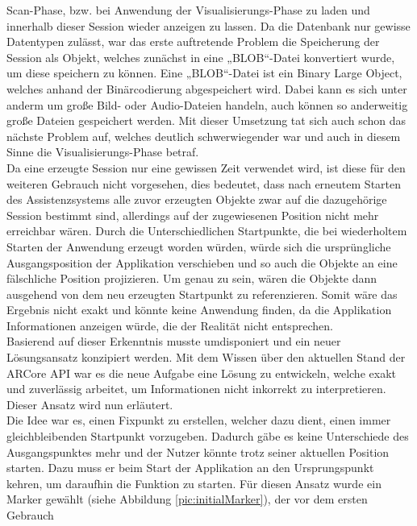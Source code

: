 Scan-Phase, bzw. bei Anwendung der Visualisierungs-Phase zu laden und innerhalb dieser Session wieder anzeigen zu lassen. Da die Datenbank nur gewisse Datentypen 
zulässt, war das erste auftretende Problem die Speicherung der Session als Objekt, welches zunächst in eine „BLOB“-Datei konvertiert wurde, um diese speichern 
zu können. Eine „BLOB“-Datei ist ein Binary Large Object, welches anhand der Binärcodierung abgespeichert wird. Dabei kann es sich unter anderm um große 
Bild- oder Audio-Dateien handeln, auch können so anderweitig große Dateien gespeichert werden. Mit dieser Umsetzung tat sich auch schon das nächste Problem auf, 
welches deutlich schwerwiegender war und auch in diesem Sinne die Visualisierungs-Phase betraf. 
\\ 
Da eine erzeugte Session nur eine gewissen Zeit verwendet wird, ist diese für den weiteren Gebrauch nicht vorgesehen, dies bedeutet, dass nach erneutem Starten 
des Assistenzsystems alle zuvor erzeugten Objekte zwar auf die dazugehörige Session bestimmt sind, allerdings auf der zugewiesenen Position 
nicht mehr erreichbar wären. Durch die Unterschiedlichen Startpunkte, die bei wiederholtem Starten der Anwendung erzeugt worden würden, 
würde sich die ursprüngliche Ausgangsposition der Applikation verschieben und so auch die Objekte an eine fälschliche Position projizieren. Um genau zu sein, 
wären die Objekte dann ausgehend von dem neu erzeugten Startpunkt zu referenzieren. Somit wäre das 
Ergebnis nicht exakt und könnte keine Anwendung finden, da die Applikation Informationen anzeigen würde, die der Realität nicht entsprechen. 
\\ 
Basierend auf dieser Erkenntnis musste umdisponiert und ein neuer Lösungsansatz konzipiert werden. Mit dem Wissen über den aktuellen Stand der ARCore \acs{API} 
war es die neue Aufgabe eine Lösung zu entwickeln, welche exakt und zuverlässig arbeitet, um Informationen nicht inkorrekt zu interpretieren. 
\\ 
Dieser Ansatz wird nun erläutert.
\\ 
\linebreak
Die Idee war es, einen Fixpunkt zu erstellen, welcher dazu dient, einen immer gleichbleibenden Startpunkt vorzugeben. Dadurch gäbe es keine Unterschiede des 
Ausgangspunktes mehr und der Nutzer könnte trotz seiner aktuellen Position starten. Dazu muss er beim Start der Applikation an den Ursprungspunkt kehren, 
um daraufhin die Funktion zu starten. Für diesen Ansatz wurde ein Marker gewählt (siehe Abbildung \ref{pic:initialMarker}), der vor dem ersten Gebrauch 
